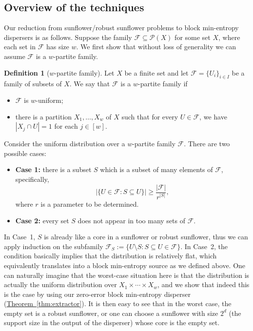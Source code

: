 \documentclass[11pt]{article}
\numberwithin{equation}{section}
\theoremstyle{definition}
\newtheorem{definition}[theorem]{Definition}
\theoremstyle{plain}
\newcommand{\expref}[2]{\hyperref[#2]{#1~\ref{#2}}}
\newcommand{\calF}{\mathcal{F}} %
\begin{document}
\subsection{Overview of the techniques} Our reduction from
sunflower/robust sunflower problems to block min-entropy dispersers
is as follows. Suppose
the family $\calF\subseteq\mathcal{P}(X)$ for some set $X$,
where each set in $\calF$ has size $w$. We first show that
without loss of generality we can assume $\calF$
%
is a $w$-partite family.  %

%
\begin{definition}[$w$-partite family]
\label{def:normal}
Let $X$ be a finite set and let $\calF= \{U_{i}\}_{i\in I}$
be a family of subsets of $X.$   We say that
$\calF$ is %
a $w$-partite family if  %
\begin{itemize}
\item %
  $\calF$ is $w$-uniform;
\item %
there is a  %
%
partition $X_{1}, \ldots, X_{w}$ of $X$ such that for every
$U \in\calF$, we have $|X_{j}\cap U|=1$ for each $j\in[w]$.
\end{itemize}
\end{definition}

\noindent Consider the uniform distribution over
%
%
%
%
a $w$-partite family $\calF$.  %
There are two possible cases:
\begin{itemize}
\item \textbf{Case 1:} there is a subset $S$ which
%
is a subset of %
many
%
elements  %
of $\calF$,
%
%
specifically,  %
$$\big|\{U\in\calF : S\subseteq U\}\big| \geq 
%
 \frac{\big|\calF\big|}{r^{|S|}},$$
where $r$ is a parameter to be determined. %

\item \textbf{Case 2:} every set $S$ does not appear in too many sets of $\calF$.
\end{itemize}

In Case~1, $S$ is already like a core in a sunflower or robust sunflower, thus we can apply induction on the %
subfamily  %
$\calF_{S}:=\{U\setminus S: S\subseteq U\in \calF\}$.
In Case~2, the condition basically implies that the distribution is relatively flat, which equivalently translates into a block min-entropy
source as we defined above. One can naturally imagine that the worst-case situation here is that the distribution is actually the uniform
distribution over $X_{1} \times \cdots \times X_{w}$, and we show that indeed this is the case by using our zero-error block min-entropy disperser (\expref{Theorem}{thm:extractor}).
It is then easy to see that in the worst case, the empty set is a robust sunflower, or one can choose a sunflower with size $2^{d}$ (the support size
in the output of the disperser) whose core is the empty set.
\end{document}
